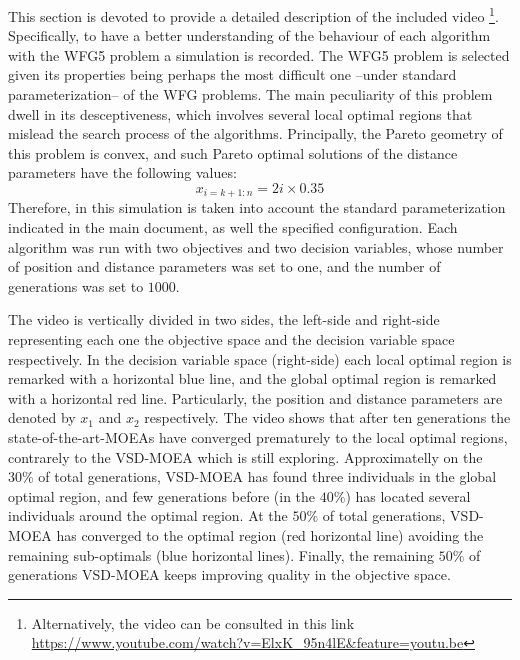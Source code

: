 This section is devoted to provide a detailed description of the included video \footnote{Alternatively, the video can be consulted in this link \url{https://www.youtube.com/watch?v=ElxK_95n4lE&feature=youtu.be}}.
%
Specifically, to have a better understanding of the behaviour of each algorithm with the WFG5 problem a simulation is recorded.
%
The WFG5 problem is selected given its properties being perhaps the most difficult one --under standard parameterization-- of the WFG problems.
%
The main peculiarity of this problem dwell in its desceptiveness, which involves several local optimal regions that mislead the search process of the algorithms.
%
Principally, the Pareto geometry of this problem is convex, and such Pareto optimal solutions of the distance parameters have the following values:
%
\begin{equation}
   x_{i=k+1:n} = 2i \times 0.35
\end{equation}
Therefore, in this simulation is taken into account the standard parameterization indicated in the main document, as well the specified configuration.
%
Each algorithm was run with two objectives and two decision variables, whose number of position and distance parameters was set to one, and the number of generations was set to $1000$.
%

The video is vertically divided in two sides, the left-side and right-side representing each one the objective space and the decision variable space respectively.
%
In the decision variable space (right-side) each local optimal region is remarked with a horizontal blue line, and the global optimal region is remarked with a horizontal red line.
%
Particularly, the position and distance parameters are denoted by $x_1$ and $x_2$ respectively.
%
The video shows that after ten generations the state-of-the-art-MOEAs have converged prematurely to the local optimal regions, contrarely to the VSD-MOEA which is still exploring.
%
Approximatelly on the $30\%$ of total generations, VSD-MOEA has found three individuals in the global optimal region, and few generations before (in the $40\%$) has located several individuals around the optimal region.
%
At the $50\%$ of total generations, VSD-MOEA has converged to the optimal region (red horizontal line) avoiding the remaining sub-optimals (blue horizontal lines).
%
Finally, the remaining $50\%$ of generations VSD-MOEA keeps improving quality in the objective space.

